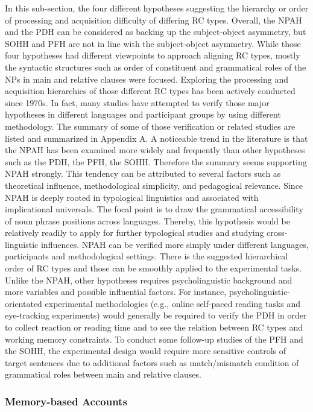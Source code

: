 \documentclass[
]{article}
\begin{document}
In this sub-section, the four different hypotheses suggesting the
hierarchy or order of processing and acquisition difficulty of differing
RC types. Overall, the NPAH and the PDH can be considered as backing up
the subject-object asymmetry, but SOHH and PFH are not in line with the
subject-object asymmetry. While those four hypotheses had different
viewpoints to approach aligning RC types, mostly the syntactic
structures such as order of constituent and grammatical roles of the NPs
in main and relative clauses were focused. Exploring the processing and
acquisition hierarchies of those different RC types has been actively
conducted since 1970s. In fact, many studies have attempted to verify
those major hypotheses in different languages and participant groups by
using different methodology. The summary of some of those verification
or related studies are listed and summarized in Appendix A. A noticeable
trend in the literature is that the NPAH has been examined more widely
and frequently than other hypotheses such as the PDH, the PFH, the SOHH.
Therefore the summary seems supporting NPAH strongly. This tendency can
be attributed to several factors such as theoretical influence,
methodological simplicity, and pedagogical relevance. Since NPAH is
deeply rooted in typological linguistics and associated with
implicational universals. The focal point is to draw the grammatical
accessibility of noun phrase positions across languages. Thereby, this
hypothesis would be relatively readily to apply for further typological
studies and studying cross-linguistic influences. NPAH can be verified
more simply under different languages, participants and methodological
settings. There is the suggested hierarchical order of RC types and
those can be smoothly applied to the experimental tasks. Unlike the
NPAH, other hypotheses requires psycholinguistic background and more
variables and possible influential factors. For instance,
psycholinguistic-orientated experimental methodologies (e.g., online
self-paced reading tasks and eye-tracking experiments) would generally
be required to verify the PDH in order to collect reaction or reading
time and to see the relation between RC types and working memory
constraints. To conduct some follow-up studies of the PFH and the SOHH,
the experimental design would require more sensitive controls of target
sentences due to additional factors such as match/mismatch condition of
grammatical roles between main and relative clauses.

\setlength{\parindent}{1.27cm}

\subsubsection{Memory-based Accounts}\label{memory-based-accounts}
\end{document}
